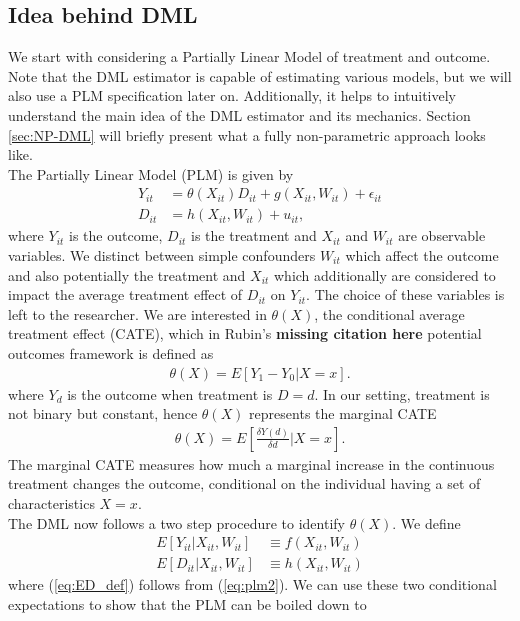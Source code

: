 \subsection{Idea behind DML} \label{sec:dml-idea}
We start with considering a Partially Linear Model of treatment and outcome. Note that the DML estimator is capable of estimating various models, but we will also use a PLM specification later on. Additionally, it helps to intuitively understand the main idea of the DML estimator and its mechanics. Section \ref{sec:NP-DML} will briefly present what a fully non-parametric approach looks like. \\ 
The Partially Linear Model (PLM) is given by
\begin{align}
    Y_{it}&=\theta(X_{it})D_{it}+g(X_{it}, W_{it})+\epsilon_{it} \label{eq:plm1}\\
    D_{it}&=h(X_{it}, W_{it})+u_{it}, \label{eq:plm2}
\end{align}
where $Y_{it}$ is the outcome, $D_{it}$ is the treatment and $X_{it}$ and $W_{it}$ are observable variables. We distinct between simple confounders $W_{it}$ which affect the outcome and also potentially the treatment and $X_{it}$ which additionally are considered to impact the average treatment effect of $D_{it}$ on $Y_{it}$. The choice of these variables is left to the researcher. We are interested in $\theta(X)$, the conditional average treatment effect (CATE), which in Rubin's \textbf{missing citation here} potential outcomes framework is defined as 
\begin{align*}
    \theta(X)=E[Y_1 - Y_0 | X=x].
\end{align*}
where $Y_d$ is the outcome when treatment is $D=d$. In our setting, treatment is not binary but constant, hence $\theta(X)$ represents the marginal CATE 
\begin{align*}
    \theta(X)=E[\frac{\delta Y(d)}{\delta d} | X=x].
\end{align*}
The marginal CATE measures how much a marginal increase in the continuous treatment changes the outcome, conditional on the individual having a set of characteristics $X=x$. \\
The DML now follows a two step procedure to identify $\theta(X)$. We define 
\begin{align}
    E[Y_{it}|X_{it}, W_{it}] &\equiv f(X_{it}, W_{it}) \label{eq:EY_def}\\ 
    E[D_{it}|X_{it}, W_{it}] &\equiv h(X_{it}, W_{it}) \label{eq:ED_def}
\end{align}
where (\ref{eq:ED_def}) follows from (\ref{eq:plm2}). We can use these two conditional expectations to show that the PLM can be boiled down to
